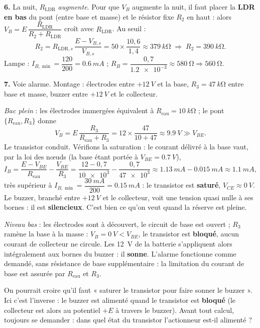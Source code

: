 \documentclass[11pt]{article}
\begin{document}
\begin{exoresolu}
\textbf{6.} La nuit, $R_{\text{LDR}}$ \emph{augmente}. Pour que $V_B$ augmente la nuit, il faut placer la \textbf{LDR en bas} du pont (entre base et masse) et le résistor fixe $R_2$ en haut : alors $V_B = E\,\dfrac{R_{\text{LDR}}}{R_2 + R_{\text{LDR}}}$ croît avec $R_{\text{LDR}}$. Au seuil :
\[ R_2 = R_{\text{LDR},s}\,\dfrac{E - V_{B,s}}{V_{B,s}} = 50\times\dfrac{10,6}{1,4} \approx \SI{379}{k\ohm} \;\Rightarrow\; R_2 = \SI{390}{k\ohm}. \]
Lampe : $I_{B,\min} = \dfrac{120}{200} = \SI{0,6}{mA}$ ; $R_B = \dfrac{0,7}{\num{1,2e-3}} \approx \SI{580}{\ohm} \Rightarrow \SI{560}{\ohm}$.

\textbf{7.} Voie alarme. Montage : électrodes entre $+\SI{12}{V}$ et la base, $R_3 = \SI{47}{k\ohm}$ entre base et masse, buzzer entre $+\SI{12}{V}$ et le collecteur.

\emph{Bac plein} : les électrodes immergées équivalent à $R_{\text{eau}} = \SI{10}{k\ohm}$ ; le pont $\{R_{\text{eau}}, R_3\}$ donne
\[ V_B = E\,\dfrac{R_3}{R_{\text{eau}} + R_3} = 12\times\dfrac{47}{10 + 47} \approx \SI{9,9}{V} \gg V_{BE}. \]
Le transistor conduit. Vérifions la saturation : le courant délivré à la base vaut, par la loi des nœuds (la base étant portée à $V_{BE} = \SI{0,7}{V}$),
\[ I_B = \dfrac{E - V_{BE}}{R_{\text{eau}}} - \dfrac{V_{BE}}{R_3} = \dfrac{12 - 0,7}{\num{10e3}} - \dfrac{0,7}{\num{47e3}} \approx \SI{1,13}{mA} - \SI{0,015}{mA} \approx \SI{1,1}{mA}, \]
très supérieur à $I_{B,\min} = \dfrac{\SI{30}{mA}}{200} = \SI{0,15}{mA}$ : le transistor est \textbf{saturé}, $V_{CE} \approx \SI{0}{V}$. Le buzzer, branché entre $+\SI{12}{V}$ et le collecteur, voit une tension quasi nulle à ses bornes : il est \textbf{silencieux}. C'est bien ce qu'on veut quand la réserve est pleine.

\emph{Niveau bas} : les électrodes sont à découvert, le circuit de base est ouvert ; $R_3$ ramène la base à la masse : $V_B = \SI{0}{V} < V_{BE}$, le transistor est \textbf{bloqué}, aucun courant de collecteur ne circule. Les \SI{12}{V} de la batterie s'appliquent alors intégralement aux bornes du buzzer : il \textbf{sonne}. L'alarme fonctionne comme demandé, sans résistance de base supplémentaire : la limitation du courant de base est assurée par $R_{\text{eau}}$ et $R_3$.

\begin{attention}
On pourrait croire qu'il faut « saturer le transistor pour faire sonner le buzzer ». Ici c'est l'inverse : le buzzer est alimenté quand le transistor est \textbf{bloqué} (le collecteur est alors au potentiel $+E$ à travers le buzzer). Avant tout calcul, toujours se demander : dans quel état du transistor l'actionneur est-il alimenté ?
\end{attention}


\end{exoresolu}
\end{document}
